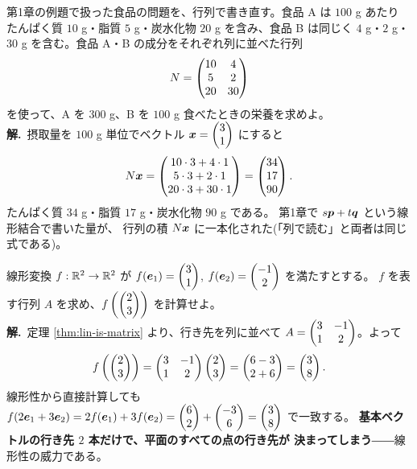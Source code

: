 \begin{rei}[例題・基本(データ)]
第1章の例題で扱った食品の問題を、行列で書き直す。食品 A は $100$ g あたり
たんぱく質 $10$ g・脂質 $5$ g・炭水化物 $20$ g を含み、食品 B は同じく
$4$ g・$2$ g・$30$ g を含む。食品 A・B の成分をそれぞれ列に並べた行列
\[
N = \begin{pmatrix}10 & 4 \\ 5 & 2 \\ 20 & 30\end{pmatrix}
\]
を使って、A を $300$ g、B を $100$ g 食べたときの栄養を求めよ。\\
\textbf{解.}\ 摂取量を $100$ g 単位でベクトル $\bm{x} = \begin{pmatrix}3 \\ 1\end{pmatrix}$ にすると
\[
N\bm{x} = \begin{pmatrix}10 \cdot 3 + 4 \cdot 1 \\ 5 \cdot 3 + 2 \cdot 1 \\
20 \cdot 3 + 30 \cdot 1\end{pmatrix} = \begin{pmatrix}34 \\ 17 \\ 90\end{pmatrix}.
\]
たんぱく質 $34$ g・脂質 $17$ g・炭水化物 $90$ g である。
第1章で $s\bm{p} + t\bm{q}$ という線形結合で書いた量が、
行列の積 $N\bm{x}$ に一本化された(「列で読む」と両者は同じ式である)。
\end{rei}

\begin{rei}[例題・標準(変換の決定)]\label{rei:find-matrix}
線形変換 $f : \mathbb{R}^2 \to \mathbb{R}^2$ が
$f(\bm{e}_1) = \begin{pmatrix}3 \\ 1\end{pmatrix}$, $f(\bm{e}_2) = \begin{pmatrix}-1 \\ 2\end{pmatrix}$ を満たすとする。
$f$ を表す行列 $A$ を求め、$f\left(\begin{pmatrix}2 \\ 3\end{pmatrix}\right)$ を計算せよ。\\
\textbf{解.}\ 定理 \ref{thm:lin-is-matrix} より、行き先を列に並べて
$A = \begin{pmatrix}3 & -1 \\ 1 & 2\end{pmatrix}$。よって
\[
f\left(\begin{pmatrix}2 \\ 3\end{pmatrix}\right) = \begin{pmatrix}3 & -1 \\ 1 & 2\end{pmatrix}\begin{pmatrix}2 \\ 3\end{pmatrix}
= \begin{pmatrix}6 - 3 \\ 2 + 6\end{pmatrix} = \begin{pmatrix}3 \\ 8\end{pmatrix}.
\]
線形性から直接計算しても
$f(2\bm{e}_1 + 3\bm{e}_2) = 2f(\bm{e}_1) + 3f(\bm{e}_2)
= \begin{pmatrix}6 \\ 2\end{pmatrix} + \begin{pmatrix}-3 \\ 6\end{pmatrix} = \begin{pmatrix}3 \\ 8\end{pmatrix}$ で一致する。
\textbf{基本ベクトルの行き先 $2$ 本だけで、平面のすべての点の行き先が
決まってしまう}――線形性の威力である。
\end{rei}

